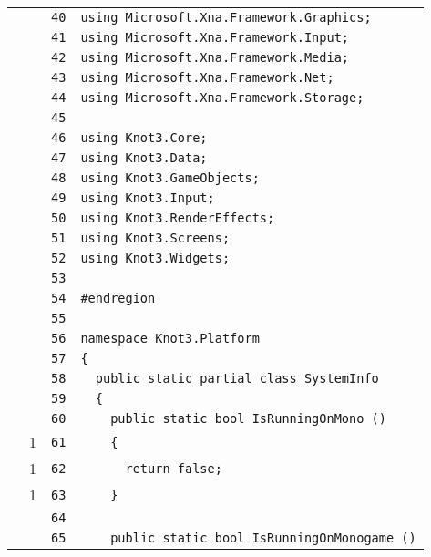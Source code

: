 \documentclass[a4paper,10pt]{article}
\begin{document}
\begin{longtable}[l]{lrrl}
\cellcolor{gray} &  & \verb~40~ & \verb~using Microsoft.Xna.Framework.Graphics;~\\
\cellcolor{gray} &  & \verb~41~ & \verb~using Microsoft.Xna.Framework.Input;~\\
\cellcolor{gray} &  & \verb~42~ & \verb~using Microsoft.Xna.Framework.Media;~\\
\cellcolor{gray} &  & \verb~43~ & \verb~using Microsoft.Xna.Framework.Net;~\\
\cellcolor{gray} &  & \verb~44~ & \verb~using Microsoft.Xna.Framework.Storage;~\\
\cellcolor{gray} &  & \verb~45~ & \verb~~\\
\cellcolor{gray} &  & \verb~46~ & \verb~using Knot3.Core;~\\
\cellcolor{gray} &  & \verb~47~ & \verb~using Knot3.Data;~\\
\cellcolor{gray} &  & \verb~48~ & \verb~using Knot3.GameObjects;~\\
\cellcolor{gray} &  & \verb~49~ & \verb~using Knot3.Input;~\\
\cellcolor{gray} &  & \verb~50~ & \verb~using Knot3.RenderEffects;~\\
\cellcolor{gray} &  & \verb~51~ & \verb~using Knot3.Screens;~\\
\cellcolor{gray} &  & \verb~52~ & \verb~using Knot3.Widgets;~\\
\cellcolor{gray} &  & \verb~53~ & \verb~~\\
\cellcolor{gray} &  & \verb~54~ & \verb~#endregion~\\
\cellcolor{gray} &  & \verb~55~ & \verb~~\\
\cellcolor{gray} &  & \verb~56~ & \verb~namespace Knot3.Platform~\\
\cellcolor{gray} &  & \verb~57~ & \verb~{~\\
\cellcolor{gray} &  & \verb~58~ & \verb~  public static partial class SystemInfo~\\
\cellcolor{gray} &  & \verb~59~ & \verb~  {~\\
\cellcolor{gray} &  & \verb~60~ & \verb~    public static bool IsRunningOnMono ()~\\
\cellcolor{green} & 1 & \verb~61~ & \verb~    {~\\
\cellcolor{green} & 1 & \verb~62~ & \verb~      return false;~\\
\cellcolor{green} & 1 & \verb~63~ & \verb~    }~\\
\cellcolor{gray} &  & \verb~64~ & \verb~~\\
\cellcolor{gray} &  & \verb~65~ & \verb~    public static bool IsRunningOnMonogame ()~\\

\end{longtable}
\end{document}
